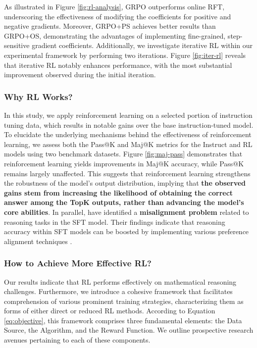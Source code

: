 \begin{itemize}[topsep=0pt]
\begin{itemize}[topsep=0pt]
As illustrated in Figure \ref{fig:rl-analysis}, GRPO outperforms online RFT, underscoring the effectiveness of modifying the coefficients for positive and negative gradients. Moreover, GRPO+PS achieves better results than GRPO+OS, demonstrating the advantages of implementing fine-grained, step-sensitive gradient coefficients. Additionally, we investigate iterative RL within our experimental framework by performing two iterations. Figure \ref{fig:iter-rl} reveals that iterative RL notably enhances performance, with the most substantial improvement observed during the initial iteration.

\subsubsection{Why RL Works?} In this study, we apply reinforcement learning on a selected portion of instruction tuning data, which results in notable gains over the base instruction-tuned model. To elucidate the underlying mechanisms behind the effectiveness of reinforcement learning, we assess both the Pass@K and Maj@K metrics for the Instruct and RL models using two benchmark datasets. Figure \ref{fig:maj-pass} demonstrates that reinforcement learning yields improvements in Maj@K accuracy, while Pass@K remains largely unaffected. This suggests that reinforcement learning strengthens the robustness of the model's output distribution, implying that \textbf{the observed gains stem from increasing the likelihood of obtaining the correct answer among the TopK outputs, rather than advancing the model's core abilities}. In parallel, \citep{wang2023making} have identified a \textbf{misalignment problem} related to reasoning tasks in the SFT model. Their findings indicate that reasoning accuracy within SFT models can be boosted by implementing various preference alignment techniques \citep{yuan2023rrhf,song2023preference,wang2023making}.

\subsubsection{How to Achieve More Effective RL?}
\label{sec:effec_rl}
Our results indicate that RL performs effectively on mathematical reasoning challenges. Furthermore, we introduce a cohesive framework that facilitates comprehension of various prominent training strategies, characterizing them as forms of either direct or reduced RL methods. According to Equation \ref{eq:objective}, this framework comprises three fundamental elements: the Data Source, the Algorithm, and the Reward Function. We outline prospective research avenues pertaining to each of these components.


\end{itemize}
\end{itemize}
